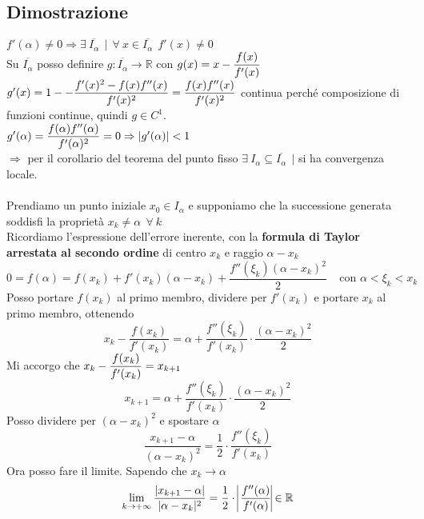 \documentclass[10pt]{book}
\begin{document}
\subsection{Dimostrazione} $f'(\alpha) \neq 0 \Rightarrow \exists\:\overline{I_{\alpha}}\:\:|\:\: \forall\:x\in\overline{I_\alpha}\:\:f'(x)\neq 0$\\
Su $\overline{I_\alpha}$ posso definire $g : \overline{I_\alpha} \rightarrow \mathbb{R}$ con $g(x) = x -\mathlarger{\frac{f(x)}{f'(x)}}$\\
$g'(x) = 1 - -\mathlarger{\frac{f'(x)^2 - f(x)f''(x)}{f'(x)^2}} = \mathlarger{\frac{f(x)f''(x)}{f'(x)^2}}$ continua perché composizione di funzioni continue, quindi $g \in C^1$.\\
$g'(\alpha) = \mathlarger{\frac{f(\alpha)f''(\alpha)}{f'(\alpha)^2}} = 0 \Rightarrow |g'(\alpha)| < 1$\\ $\Rightarrow$ per il corollario del teorema del punto fisso $\exists\:I_\alpha\subseteq\overline{I_\alpha}\:\:|$ si ha convergenza locale.\\\\
Prendiamo un punto iniziale $x_0 \in I_\alpha$ e supponiamo che la successione generata soddisfi la proprietà $x_k \neq \alpha\:\:\forall\: k$\\
Ricordiamo l'espressione dell'errore inerente, con la \textbf{formula di Taylor arrestata al secondo ordine} di centro $x_k$ e raggio $\alpha - x_k$
$$0 = f(\alpha) = f(x_k) + f'(x_k)(\alpha - x_k) + \frac{f''(\xi_k)(\alpha - x_k)^2}{2}\:\:\:\:\:\text{con }\alpha < \xi_k < x_k$$
Posso portare $f(x_k)$ al primo membro, dividere per $f'(x_k)$ e portare $x_k$ al primo membro, ottenendo
$$x_k - \frac{f(x_k)}{f'(x_k)} = \alpha + \frac{f''(\xi_k)}{f'(x_k)}\cdot\frac{(\alpha - x_k)^2}{2}$$
Mi accorgo che $\mathlarger{x_k - \frac{f(x_k)}{f'(x_k)} = x_{k+1}}$
$$x_{k+1} = \alpha + \frac{f''(\xi_k)}{f'(x_k)}\cdot\frac{(\alpha - x_k)^2}{2}$$
Posso dividere per $(\alpha - x_k)^2$ e spostare $\alpha$
$$\frac{x_{k+1} - \alpha}{(\alpha - x_k)^2} = \frac{1}{2}\cdot\frac{f''(\xi_k)}{f'(x_k)}$$
Ora posso fare il limite. Sapendo che $x_k \rightarrow \alpha$
$$\lim_{k\to+\infty}\frac{|x_{k+1} - \alpha|}{|\alpha - x_k|^2} = \frac{1}{2}\cdot\:\vline\frac{f''(\alpha)}{f'(\alpha)}\vline \in \mathbb{R}$$
\end{document}
